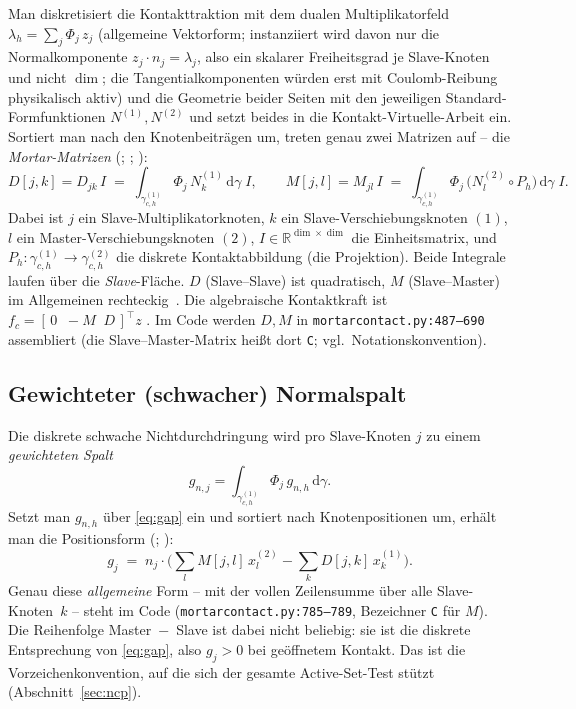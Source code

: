 \documentclass[a4paper,11pt]{article}
\def\bm#1{#1}%
\def\tilde#1{#1}%
\newcommand{\code}[1]{\texttt{\small #1}}
\newcommand{\file}[1]{\texttt{\small #1}}
\begin{document}
Man diskretisiert die Kontakttraktion mit dem dualen Multiplikatorfeld
$\bm\lambda_h = \sum_j \Phi_j\,\bm z_j$ (allgemeine Vektorform; instanziiert wird davon nur die
Normalkomponente $\bm z_j\!\cdot\!\bm n_j=\lambda_j$, also ein skalarer Freiheitsgrad je
Slave-Knoten und nicht $\dim$; die Tangentialkomponenten würden erst mit Coulomb-Reibung physikalisch
aktiv) und die Geometrie beider Seiten mit den jeweiligen
Standard-Formfunktionen $N^{(1)},N^{(2)}$ und setzt beides in die Kontakt-Virtuelle-Arbeit ein.
Sortiert man nach den Knotenbeiträgen um, treten genau zwei Matrizen auf -- die \emph{Mortar-Matrizen}
(\citealp[Gl.~(3.34)--(3.36)]{farah}; \citealp[Gl.~(3.5)--(3.6)]{popp2012}; \citealp[Gl.~(35)/(36)]{poppgeewall2009}):
\begin{equation}
\bm D[j,k] = D_{jk}\,\bm I \;=\; \int_{\gamma_{c,h}^{(1)}} \Phi_j\,N_k^{(1)}\,\mathrm d\gamma\;\bm I,
\qquad
\bm M[j,l] = M_{jl}\,\bm I \;=\; \int_{\gamma_{c,h}^{(1)}} \Phi_j\,\big(N_l^{(2)}\!\circ P_h\big)\,\mathrm d\gamma\;\bm I .
\label{eq:DM}
\end{equation}
Dabei ist $j$ ein Slave-Multiplikatorknoten, $k$ ein Slave-Verschiebungsknoten $(1)$, $l$ ein
Master-Verschiebungsknoten $(2)$, $\bm I\in\mathbb R^{\dim\times\dim}$ die Einheitsmatrix, und
$P_h:\gamma_{c,h}^{(1)}\!\to\!\gamma_{c,h}^{(2)}$ die diskrete Kontaktabbildung (die Projektion). Beide
Integrale laufen über die \emph{Slave}-Fläche. $\bm D$ (Slave--Slave) ist quadratisch, $\bm M$
(Slave--Master) im Allgemeinen rechteckig~\citep[S.~B427]{popp2012}. Die algebraische Kontaktkraft ist
$\bm f_c = [\,\bm 0\;\;-\bm M\;\;\bm D\,]^{\!\top}\bm z$ \citep[Gl.~(3.38)]{farah}. Im Code werden
$\bm D,\bm M$ in \file{mortarcontact.py:\allowbreak{}487--690} assembliert (die Slave--Master-Matrix heißt dort
\code{C}; vgl.\ Notationskonvention).

\subsection{Gewichteter (schwacher) Normalspalt}
Die diskrete schwache Nichtdurchdringung wird pro Slave-Knoten $j$ zu einem \emph{gewichteten Spalt}
\citep[Gl.~(3.40)]{farah}
\begin{equation}
\tilde g_{n,j} = \int_{\gamma_{c,h}^{(1)}} \Phi_j\, g_{n,h}\,\mathrm d\gamma .
\label{eq:wgap_int}
\end{equation}
Setzt man $g_{n,h}$ über \eqref{eq:gap} ein und sortiert nach Knotenpositionen um, erhält man die
Positionsform (\citealp[Gl.~(36) und~(50)]{gitterle}; \citealp[Gl.~(50)]{poppgeewall2009}):
\begin{equation}
\tilde g_{j} \;=\; \bm n_j\!\cdot\!\Big(\sum_l \bm M[j,l]\,\bm x_l^{(2)}
- \sum_k \bm D[j,k]\,\bm x_k^{(1)}\Big).
\label{eq:wgap_pos}
\end{equation}
Genau diese \emph{allgemeine} Form -- mit der vollen Zeilensumme über alle Slave-Knoten~$k$ --
steht im Code (\file{mortarcontact.py:\allowbreak{}785--789}, Bezeichner \code{C} für $\bm M$).
Die Reihenfolge Master~$-$~Slave ist dabei nicht beliebig: sie ist die diskrete Entsprechung
von \eqref{eq:gap}, also $\tilde g_j>0$ bei geöffnetem Kontakt. Das ist die Vorzeichen\-konvention,
auf die sich der gesamte Active-Set-Test stützt (Abschnitt~\ref{sec:ncp}).
\end{document}
